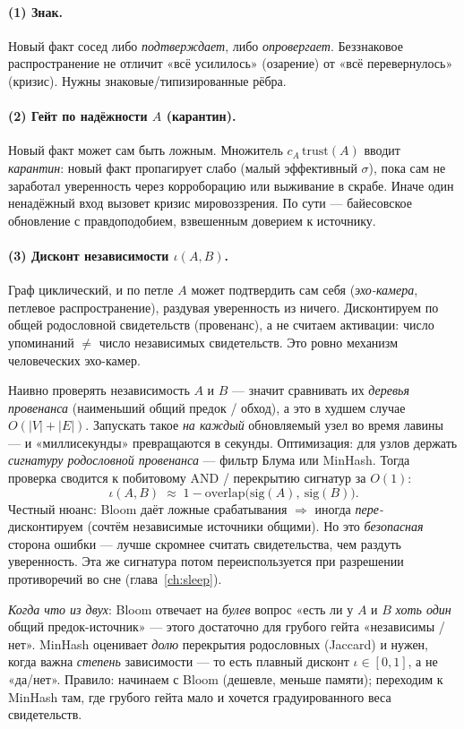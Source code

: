 \paragraph{(1) Знак.} Новый факт сосед либо \emph{подтверждает}, либо
\emph{опровергает}. Беззнаковое распространение не отличит «всё усилилось»
(озарение) от «всё перевернулось» (кризис). Нужны знаковые/типизированные рёбра.

\paragraph{(2) Гейт по надёжности $A$ (карантин).} Новый факт может сам быть ложным.
Множитель $c_A\,\mathrm{trust}(A)$ вводит \emph{карантин}: новый факт пропагирует
слабо (малый эффективный $\sigma$), пока сам не заработал уверенность через
корроборацию или выживание в скрабе. Иначе один ненадёжный вход вызовет кризис
мировоззрения. По сути — байесовское обновление с правдоподобием, взвешенным
доверием к источнику.

\paragraph{(3) Дисконт независимости $\iota(A,B)$.} Граф циклический, и по петле $A$
может подтвердить сам себя (\emph{эхо-камера}, петлевое распространение), раздувая
уверенность из ничего. Дисконтируем по общей родословной свидетельств (провенанс), а
не считаем активации: число упоминаний $\ne$ число независимых свидетельств. Это
ровно механизм человеческих эхо-камер.

\begin{pitfall}
Наивно проверять независимость $A$ и $B$ — значит сравнивать их \emph{деревья
провенанса} (наименьший общий предок / обход), а это в худшем случае
$O(|V|{+}|E|)$. Запускать такое \emph{на каждый} обновляемый узел во время лавины —
и «миллисекунды» превращаются в секунды. Оптимизация: для узлов держать
\emph{сигнатуру родословной провенанса} — фильтр Блума или MinHash. Тогда проверка
сводится к побитовому AND / перекрытию сигнатур за $O(1)$:
\[
\iota(A,B)\;\approx\;1-\mathrm{overlap}\big(\mathrm{sig}(A),\ \mathrm{sig}(B)\big).
\]
Честный нюанс: Bloom даёт ложные срабатывания $\Rightarrow$ иногда \emph{пере-}
дисконтируем (сочтём независимые источники общими). Но это \emph{безопасная} сторона
ошибки — лучше скромнее считать свидетельства, чем раздуть уверенность. Эта же
сигнатура потом переиспользуется при разрешении противоречий во сне
(глава~\ref{ch:sleep}).

\emph{Когда что из двух}: Bloom отвечает на \emph{булев} вопрос «есть ли у $A$ и $B$
\emph{хоть один} общий предок-источник» — этого достаточно для грубого гейта
«независимы / нет». MinHash оценивает \emph{долю} перекрытия родословных (Jaccard) и
нужен, когда важна \emph{степень} зависимости — то есть плавный дисконт $\iota\in[0,1]$,
а не «да/нет». Правило: начинаем с Bloom (дешевле, меньше памяти); переходим к MinHash
там, где грубого гейта мало и хочется градуированного веса свидетельств.
\end{pitfall}

